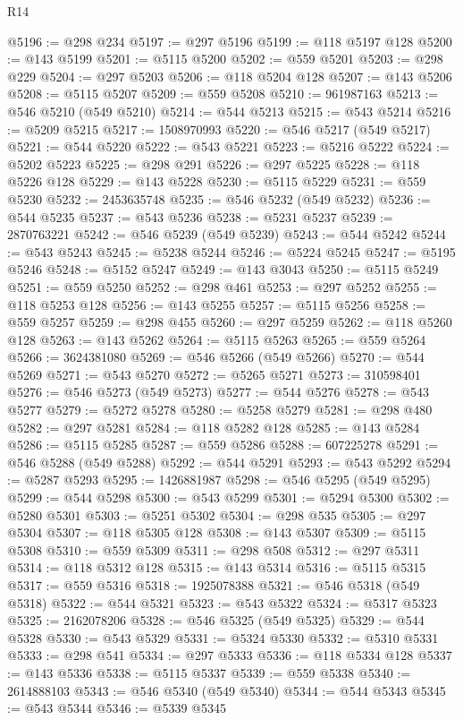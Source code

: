 \begin{lexlean}{R14}
\begin{coremodule}
{{{{{{{{{{{{{{{{{{{{{{{{{{{{{{{{{{{{{{{{{{{{{{{{{{{{{{{{{{{{{{{{{{{{{{{{{{{{{{{{{{@5196 := @298 @234
@5197 := @297 @5196
@5199 := @118 @5197 @128
@5200 := @143 @5199
@5201 := @5115 @5200
@5202 := @559 @5201
@5203 := @298 @229
@5204 := @297 @5203
@5206 := @118 @5204 @128
@5207 := @143 @5206
@5208 := @5115 @5207
@5209 := @559 @5208
@5210 := 961987163
@5213 := @546 @5210 (@549 @5210)
@5214 := @544 @5213
@5215 := @543 @5214
@5216 := @5209 @5215
@5217 := 1508970993
@5220 := @546 @5217 (@549 @5217)
@5221 := @544 @5220
@5222 := @543 @5221
@5223 := @5216 @5222
@5224 := @5202 @5223
@5225 := @298 @291
@5226 := @297 @5225
@5228 := @118 @5226 @128
@5229 := @143 @5228
@5230 := @5115 @5229
@5231 := @559 @5230
@5232 := 2453635748
@5235 := @546 @5232 (@549 @5232)
@5236 := @544 @5235
@5237 := @543 @5236
@5238 := @5231 @5237
@5239 := 2870763221
@5242 := @546 @5239 (@549 @5239)
@5243 := @544 @5242
@5244 := @543 @5243
@5245 := @5238 @5244
@5246 := @5224 @5245
@5247 := @5195 @5246
@5248 := @5152 @5247
@5249 := @143 @3043
@5250 := @5115 @5249
@5251 := @559 @5250
@5252 := @298 @461
@5253 := @297 @5252
@5255 := @118 @5253 @128
@5256 := @143 @5255
@5257 := @5115 @5256
@5258 := @559 @5257
@5259 := @298 @455
@5260 := @297 @5259
@5262 := @118 @5260 @128
@5263 := @143 @5262
@5264 := @5115 @5263
@5265 := @559 @5264
@5266 := 3624381080
@5269 := @546 @5266 (@549 @5266)
@5270 := @544 @5269
@5271 := @543 @5270
@5272 := @5265 @5271
@5273 := 310598401
@5276 := @546 @5273 (@549 @5273)
@5277 := @544 @5276
@5278 := @543 @5277
@5279 := @5272 @5278
@5280 := @5258 @5279
@5281 := @298 @480
@5282 := @297 @5281
@5284 := @118 @5282 @128
@5285 := @143 @5284
@5286 := @5115 @5285
@5287 := @559 @5286
@5288 := 607225278
@5291 := @546 @5288 (@549 @5288)
@5292 := @544 @5291
@5293 := @543 @5292
@5294 := @5287 @5293
@5295 := 1426881987
@5298 := @546 @5295 (@549 @5295)
@5299 := @544 @5298
@5300 := @543 @5299
@5301 := @5294 @5300
@5302 := @5280 @5301
@5303 := @5251 @5302
@5304 := @298 @535
@5305 := @297 @5304
@5307 := @118 @5305 @128
@5308 := @143 @5307
@5309 := @5115 @5308
@5310 := @559 @5309
@5311 := @298 @508
@5312 := @297 @5311
@5314 := @118 @5312 @128
@5315 := @143 @5314
@5316 := @5115 @5315
@5317 := @559 @5316
@5318 := 1925078388
@5321 := @546 @5318 (@549 @5318)
@5322 := @544 @5321
@5323 := @543 @5322
@5324 := @5317 @5323
@5325 := 2162078206
@5328 := @546 @5325 (@549 @5325)
@5329 := @544 @5328
@5330 := @543 @5329
@5331 := @5324 @5330
@5332 := @5310 @5331
@5333 := @298 @541
@5334 := @297 @5333
@5336 := @118 @5334 @128
@5337 := @143 @5336
@5338 := @5115 @5337
@5339 := @559 @5338
@5340 := 2614888103
@5343 := @546 @5340 (@549 @5340)
@5344 := @544 @5343
@5345 := @543 @5344
@5346 := @5339 @5345
}}}}}}}}}}}}}}}}}}}}}}}}}}}}}}}}}}}}}}}}}}}}}}}}}}}}}}}}}}}}}}}}}}}}}}}}}}}}}}}}}}
\end{coremodule}
\end{lexlean}
